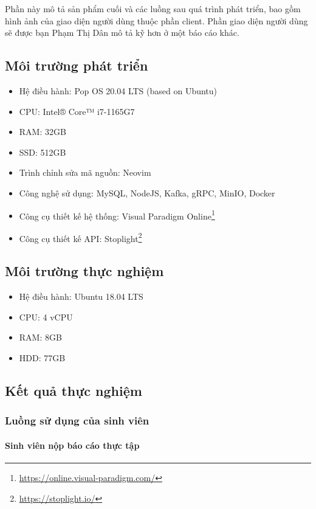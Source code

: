 \documentclass[./../main.tex]{subfiles}
\begin{document}
Phần này mô tả sản phẩm cuối và các luồng sau quá trình phát triển, bao gồm hình ảnh của giao diện người dùng thuộc phần client. Phần giao diện người dùng sẽ được bạn Phạm Thị Dân mô tả kỹ hơn ở một báo cáo khác.

\subsection{Môi trường phát triển}

\begin{itemize}
	\item Hệ điều hành: Pop OS 20.04 LTS (based on Ubuntu)
	\item CPU: Intel® Core™ i7-1165G7
	\item RAM: 32GB
	\item SSD: 512GB
	\item Trình chỉnh sửa mã nguồn: Neovim
	\item Công nghệ sử dụng: MySQL, NodeJS, Kafka, gRPC, MinIO, Docker
	\item Công cụ thiết kế hệ thống: Visual Paradigm Online\footnote{\url{https://online.visual-paradigm.com/}}
	\item Công cụ thiết kế API: Stoplight\footnote{\url{https://stoplight.io/}}
\end{itemize}

\subsection{Môi trường thực nghiệm}

\begin{itemize}
	\item Hệ điều hành: Ubuntu 18.04 LTS
	\item CPU: 4 vCPU
	\item RAM: 8GB
	\item HDD: 77GB
\end{itemize}

\subsection{Kết quả thực nghiệm}

\subsubsection{Luồng sử dụng của sinh viên}

\paragraph*{Sinh viên nộp báo cáo thực tập}
\end{document}
